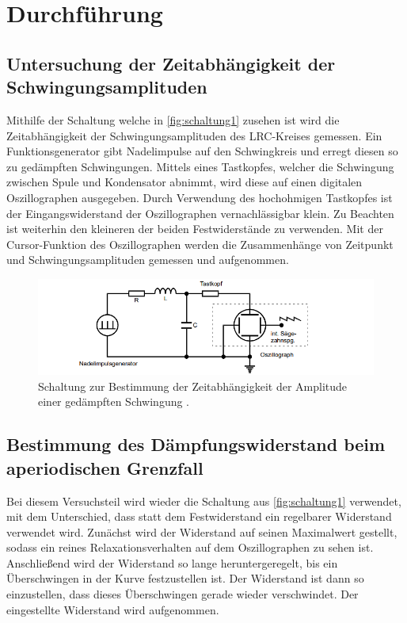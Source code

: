 \section{Durchführung}
\label{sec:Durchführung}
    \subsection{Untersuchung der Zeitabhängigkeit der Schwingungsamplituden}
        Mithilfe der Schaltung welche in \autoref{fig:schaltung1} zusehen ist wird die Zeitabhängigkeit der Schwingungsamplituden des LRC-Kreises gemessen.
        Ein Funktionsgenerator gibt Nadelimpulse auf den Schwingkreis und erregt diesen so zu gedämpften Schwingungen. Mittels eines Tastkopfes, welcher die Schwingung zwischen Spule
        und Kondensator abnimmt, wird diese auf einen digitalen Oszillographen ausgegeben. Durch Verwendung des hochohmigen Tastkopfes ist der 
        Eingangswiderstand der Oszillographen vernachlässigbar klein. 
        Zu Beachten ist weiterhin den kleineren der beiden Festwiderstände zu verwenden.
        Mit der Cursor-Funktion des Oszillographen werden die Zusammenhänge von Zeitpunkt und Schwingungsamplituden gemessen und aufgenommen.
        \begin{figure}
            \centering
            \includegraphics[width=\textwidth]{content/s1.png}
            \caption{Schaltung zur Bestimmung der Zeitabhängigkeit der Amplitude einer gedämpften Schwingung \cite[294]{V354}.}
            \label{fig:schaltung1}
        \end{figure} 
    \subsection{Bestimmung des Dämpfungswiderstand beim aperiodischen Grenzfall}    
        Bei diesem Versuchsteil wird wieder die Schaltung aus \autoref{fig:schaltung1} verwendet, mit dem Unterschied, dass statt dem Festwiderstand
        ein regelbarer Widerstand verwendet wird. Zunächst wird der Widerstand auf seinen Maximalwert gestellt, sodass ein reines Relaxationsverhalten
        auf dem Oszillographen zu sehen ist. Anschließend wird der Widerstand so lange heruntergeregelt, bis ein Überschwingen in der Kurve festzustellen ist.
        Der Widerstand ist dann so einzustellen, dass dieses Überschwingen gerade wieder verschwindet. Der eingestellte Widerstand wird aufgenommen.
